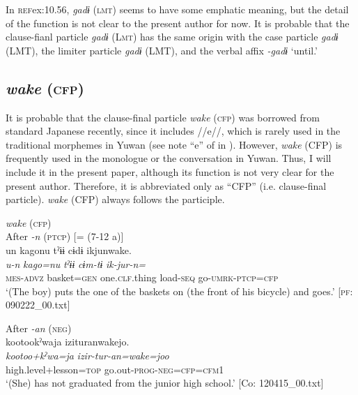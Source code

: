 In \textsc{ref}{ex:10.56}, \textit{gadɨ} (\textsc{lmt}) seems to have some emphatic meaning, but the detail of the function is not clear to the present author for now. It is probable that the clause-fianl particle \textit{gadɨ} (L\textsc{mt}) has the same origin with the case particle \textit{gadɨ} (LMT), the limiter particle \textit{gadɨ} (LMT), and the verbal affix \textit{{}-gadɨ} ‘until.’

\subsection{\textit{wake} (\textsc{cfp})}\label{sec:10.3.11}

It is probable that the clause-final particle \textit{wake} (\textsc{cfp}) was borrowed from standard Japanese recently, since it includes //e//, which is rarely used in the traditional morphemes in Yuwan (see note “e” of  in ). However, \textit{wake} (CFP) is frequently used in the monologue or the conversation in Yuwan. Thus, I will include it in the present paper, although its function is not very clear for the present author. Therefore, it is abbreviated only as “CFP” (i.e. clause-final particle). \textit{wake} (CFP) always follows the participle.

\ea\label{ex:10.57}   \textit{wake} (\textsc{cfp})\\
  \ea After \textit{{}-n} (\textsc{ptcp}) [= (7-12 a)]\\
      \glll    un  kagonu  tˀɨɨ  cɨdɨ  ikjunwake.\\
    \textit{u-n}  \textit{kago=nu}  \textit{tˀɨɨ}  \textit{cɨm-tɨ}  \textit{ik-jur-n=}\\
    \textsc{mes}-\textsc{advz}  basket=\textsc{gen}  one.\textsc{clf}.thing  load-\textsc{seq}  go-\textsc{umrk}-\textsc{ptcp}=\textsc{cfp}\\
    \glt     ‘(The boy) puts the one of the baskets on (the front of his bicycle) and goes.’ [\textsc{pf}: 090222\_00.txt]

  \ex After \textit{{}-an} (\textsc{neg})\\
      \glll    kootookˀwaja  izituranwakejo.\\
    \textit{kootoo+kˀwa=ja}  \textit{izir-tur-an=wake=joo}\\
    high.level+lesson=\textsc{top}  go.out-\textsc{prog}-\textsc{neg}=\textsc{cfp}=\textsc{cfm}1\\
  \glt     ‘(She) has not graduated from the junior high school.’  [Co: 120415\_00.txt]
  \z
\z



